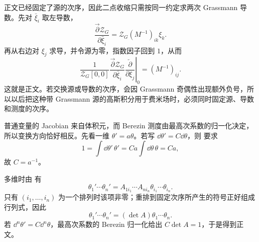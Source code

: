 \begin{derivation}
正文已经固定了源的次序，因此二点收缩只需按同一约定求两次 Grassmann 导数。先对 $\bar\xi_i$ 取左导数，
\begin{equation*}
 \frac{\overrightarrow\partial\mathcal Z_G}{\partial\bar\xi_i}
 =\mathcal Z_G(M^{-1})_{ik}\xi_k.
\end{equation*}
再从右边对 $\xi_j$ 求导，并令源为零，指数因子回到 $1$，从而
\begin{equation*}
 \left.
 \frac{1}{\mathcal Z_G[0,0]}
 \frac{\overrightarrow\partial\mathcal Z_G}{\partial\bar\xi_i}
 \frac{\overleftarrow\partial}{\partial\xi_j}
 \right|_{0}
 =(M^{-1})_{ij}.
\end{equation*}
这就是正文。若交换源或导数的次序，会因 Grassmann 奇偶性出现额外负号，所以以后把这种带 Grassmann 源的高斯积分用于费米场时，必须同时固定源、导数和测度的次序。
\end{derivation}

\begin{derivation}
普通变量的 Jacobian 来自体积元，而 Berezin 测度由最高次系数的归一化决定，所以变换方向恰好相反。先看一维 $\theta'=a\theta$。若写 $\dd\theta'=C\dd\theta$，则 要求
\begin{equation*}
 1=\int\dd\theta'\,\theta'
 =Ca\int\dd\theta\,\theta=Ca,
\end{equation*}
故 $C=a^{-1}$。

多维时由 有
\begin{equation*}
 \theta_1'\cdots\theta_n'
 =A_{1i_1}\cdots A_{ni_n}\theta_{i_1}\cdots\theta_{i_n}.
\end{equation*}
只有 $(i_1,\ldots,i_n)$ 为一个排列时该项非零；重排到固定次序所产生的符号正好组成行列式，因此
\begin{equation*}
 \theta_1'\cdots\theta_n'=(\det A)\theta_1\cdots\theta_n.
\end{equation*}
若 $\dd^n\theta'=C\dd^n\theta$，最高次系数的 Berezin 归一化给出 $C\det A=1$，于是得到正文。
\end{derivation}
